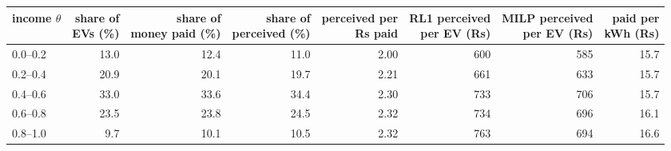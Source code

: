 \begin{tabular}{@{}lrrrrrrr@{}}
\toprule
income $\theta$ & \shortstack[r]{share of\\EVs (\%)} & \shortstack[r]{share of\\money paid (\%)} & \shortstack[r]{share of\\perceived (\%)} & \shortstack[r]{perceived per\\Rs paid} & \shortstack[r]{RL1 perceived\\per EV (Rs)} & \shortstack[r]{MILP perceived\\per EV (Rs)} & \shortstack[r]{paid per\\kWh (Rs)} \\
\midrule
0.0--0.2 & 13.0 & 12.4 & 11.0 & 2.00 & 600 & 585 & 15.7 \\
0.2--0.4 & 20.9 & 20.1 & 19.7 & 2.21 & 661 & 633 & 15.7 \\
0.4--0.6 & 33.0 & 33.6 & 34.4 & 2.30 & 733 & 706 & 15.7 \\
0.6--0.8 & 23.5 & 23.8 & 24.5 & 2.32 & 734 & 696 & 16.1 \\
0.8--1.0 & 9.7 & 10.1 & 10.5 & 2.32 & 763 & 694 & 16.6 \\
\bottomrule
\end{tabular}

